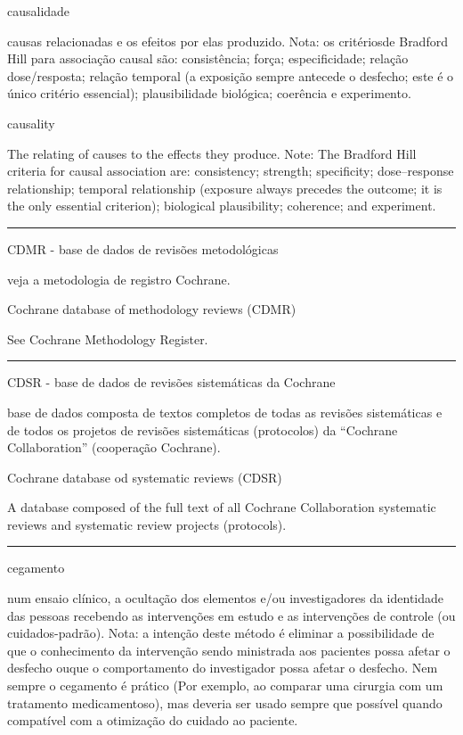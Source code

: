 \documentclass[
  openany]{book}
\begin{document}
causalidade

causas relacionadas e os efeitos por elas produzido. Nota: os critériosde Bradford Hill para associação causal são: consistência; força; especificidade; relação dose/resposta; relação temporal (a exposição sempre antecede o desfecho; este é o único critério essencial); plausibilidade biológica; coerência e experimento.

causality

The relating of causes to the effects they produce. Note: The Bradford Hill criteria for causal association are: consistency; strength; specificity; dose--response relationship; temporal relationship (exposure always precedes the outcome; it is the only essential criterion); biological plausibility; coherence; and experiment.

\begin{center}\rule{0.5\linewidth}{0.5pt}\end{center}

CDMR - base de dados de revisões metodológicas

veja a metodologia de registro Cochrane.

Cochrane database of methodology reviews (CDMR)

See Cochrane Methodology Register.

\begin{center}\rule{0.5\linewidth}{0.5pt}\end{center}

CDSR - base de dados de revisões sistemáticas da Cochrane

base de dados composta de textos completos de todas as revisões sistemáticas e de todos os projetos de revisões sistemáticas (protocolos) da ``Cochrane Collaboration'' (cooperação Cochrane).

Cochrane database od systematic reviews (CDSR)

A database composed of the full text of all Cochrane Collaboration systematic reviews and systematic review projects (protocols).

\begin{center}\rule{0.5\linewidth}{0.5pt}\end{center}

cegamento

num ensaio clínico, a ocultação dos elementos e/ou investigadores da identidade das pessoas recebendo as intervenções em estudo e as intervenções de controle (ou cuidados-padrão). Nota: a intenção deste método é eliminar a possibilidade de que o conhecimento da intervenção sendo ministrada aos pacientes possa afetar o desfecho ouque o comportamento do investigador possa afetar o desfecho. Nem sempre o cegamento é prático (Por exemplo, ao comparar uma cirurgia com um tratamento medicamentoso), mas deveria ser usado sempre que possível quando compatível com a otimização do cuidado ao paciente.
\end{document}

